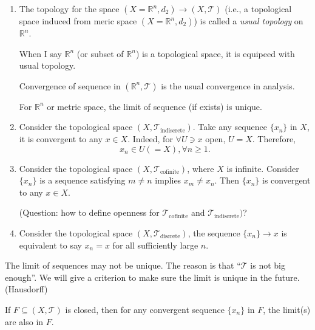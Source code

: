 \begin{example}
\begin{enumerate}
\item
The topology for the space $(X=\mathbb{R}^n,d_2)\to(X,\mathcal{T})$ (i.e., a topological space induced from meric space $(X=\mathbb{R}^n,d_2)$) is called a \emph{usual topology} on $\mathbb{R}^n$.

When I say $\mathbb{R}^n$ (or subset of $\mathbb{R}^n$) is a topological space, 
it is equipeed with usual topology.

Convergence of sequence in $(\mathbb{R}^n,\mathcal{T})$ is the usual convergence in analysis.

For $\mathbb{R}^n$ or metric space, the limit of sequence (if exists) is unique.

\item

Consider the topological space $(X,\mathcal{T}_{\text{indiscrete}})$. 
Take any sequence $\{x_n\}$ in $X$, it is convergent to any $x\in X$. 
Indeed, for $\forall U\ni x$ open, $U=X$. Therefore, 
\[
x_n\in U(=X),\forall n\ge1.
\]
\item

Consider the topological space $(X,\mathcal{T}_{\text{cofinite}})$, where $X$ is infinite. 
Consider $\{x_n\}$ is a sequence satisfying $m\ne n$ implies $x_m\ne x_n$. 
Then $\{x_n\}$ is convergent to any $x\in X$.

(Question: how to define openness for $\mathcal{T}_{\text{cofinite}}$ and $\mathcal{T}_{\text{indiscrete}})$?
\item

Consider the topological space $(X,\mathcal{T}_{\text{discrete}})$, 
the sequence $\{x_n\}\to x$ is equivalent to say $x_n=x$ for all sufficiently large $n$.
\end{enumerate}
\end{example}
\begin{remark}
The limit of sequences may not be unique. The reason is that ``$\mathcal{T}$ is not big enough''. We will give a criterion to make sure the limit is unique in the future. (Hausdorff)
\end{remark}
\begin{proposition}\label{pro:2:9}
If $F\subseteq(X,\mathcal{T})$ is closed, then for any convergent sequence $\{x_n\}$ in $F$, the limit(s) are also in $F$.
\end{proposition}

